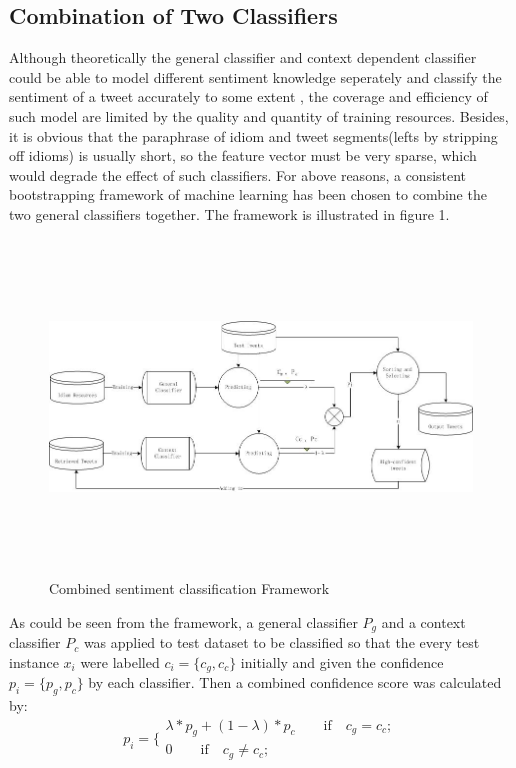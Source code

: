 \documentclass{llncs}
\begin{document}
\subsection{Combination of Two Classifiers}
Although theoretically the general classifier and context dependent classifier could be able to model different sentiment knowledge seperately and classify the sentiment of a tweet accurately to some extent , 
the coverage and efficiency of such model are limited by the quality and quantity of training resources. 
Besides, it is obvious that the paraphrase of idiom and tweet segments(lefts by stripping off idioms) is usually short, so the feature vector must be very sparse, which would degrade the effect of such classifiers. 
For above reasons, a consistent bootstrapping framework of machine learning has been chosen to combine the two general classifiers together. 
The framework is illustrated in figure 1. 
\begin{figure} 
\centering%
\includegraphics[width=5.5in,height=3.5in]{itse13.jpg}
\caption{Combined sentiment classification Framework}
\label{fig:graph}
\end{figure}
As could be seen from the framework, a general classifier $ P_{g} $ and a context classifier $ P_{c} $ was applied to test dataset to be classified so that the every test instance $ x_{i} $ were labelled $ c_{i}=\lbrace c_{g},c_{c}\rbrace $ initially and given the confidence $ p_{i}= \lbrace p_{g},p_{c}\rbrace$ by each classifier. 
Then a combined confidence score was calculated by:
\begin{equation}
p_{i}=\lbrace
\begin{array}{rcl}
\lambda\ast p_{g} + \left( 1-\lambda \right) \ast p_{c} \qquad \mathrm{if} \quad c_{g}=c_{c};\\
0 \qquad \mathrm{if} \quad c_{g} \neq c_{c};
\end{array}
\end{equation}
\end{document}
